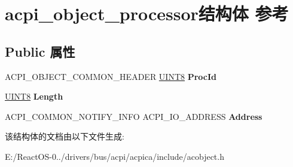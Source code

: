 \hypertarget{structacpi__object__processor}{}\section{acpi\+\_\+object\+\_\+processor结构体 参考}
\label{structacpi__object__processor}
\subsection*{Public 属性}
\begin{DoxyCompactItemize}
\item 
\mbox{\label{structacpi__object__processor_afe1298e7fcae5892945f387c9b31932e}} 
A\+C\+P\+I\+\_\+\+O\+B\+J\+E\+C\+T\+\_\+\+C\+O\+M\+M\+O\+N\+\_\+\+H\+E\+A\+D\+ER \hyperlink{_processor_bind_8h_ab27e9918b538ce9d8ca692479b375b6a}{U\+I\+N\+T8} {\bfseries Proc\+Id}
\item 
\mbox{\label{structacpi__object__processor_a4ffcdc7ac7638fdb289bf587bd2cb4ce}} 
\hyperlink{_processor_bind_8h_ab27e9918b538ce9d8ca692479b375b6a}{U\+I\+N\+T8} {\bfseries Length}
\item 
\mbox{\label{structacpi__object__processor_a148452ed8a659629b38ad61cb767d37f}} 
A\+C\+P\+I\+\_\+\+C\+O\+M\+M\+O\+N\+\_\+\+N\+O\+T\+I\+F\+Y\+\_\+\+I\+N\+FO A\+C\+P\+I\+\_\+\+I\+O\+\_\+\+A\+D\+D\+R\+E\+SS {\bfseries Address}
\end{DoxyCompactItemize}


该结构体的文档由以下文件生成\+:\begin{DoxyCompactItemize}
\item 
E\+:/\+React\+O\+S-\/0../drivers/bus/acpi/acpica/include/acobject.\+h\end{DoxyCompactItemize}
